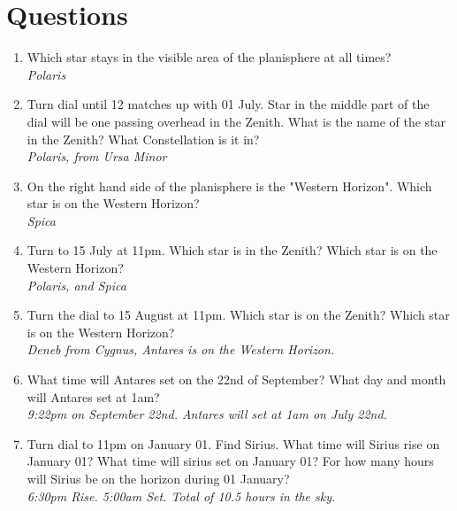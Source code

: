 \documentclass{article}
\begin{document}
\section{Questions}
\begin{enumerate}
\item Which star stays in the visible area of the planisphere at all times?\\
\emph{Polaris}\\ 
\item Turn dial until 12 matches up with 01 July.  Star in the middle part of the dial will be one passing overhead in the Zenith.  What is the name of the star in the Zenith?  What Constellation is it in?\\
\emph{Polaris, from Ursa Minor}\\
\item On the right hand side of the planisphere is the "Western Horizon".  Which star is on the Western Horizon?\\
\emph{Spica}\\
\item Turn to 15 July at 11pm.  Which star is in the Zenith?  Which star is on the Western Horizon?\\
\emph{Polaris, and Spica}
\item Turn the dial to 15 August at 11pm.  Which star is on the Zenith?  Which star is on the Western Horizon?\\
\emph{Deneb from Cygnus, Antares is on the Western Horizon.}
\item What time will Antares set on the 22nd of September?  What day and month will Antares set at 1am?\\
\emph{9:22pm on September 22nd.  Antares will set at 1am on July 22nd.}\\
\item Turn dial to 11pm on January 01.  Find Sirius.  What time will Sirius rise on January 01?  What time will sirius set on January 01?  For how many hours will Sirius be on the horizon during 01 January?\\
\emph{6:30pm Rise.  5:00am Set.  Total of 10.5 hours in the sky.}
\end{enumerate}
\end{document}
